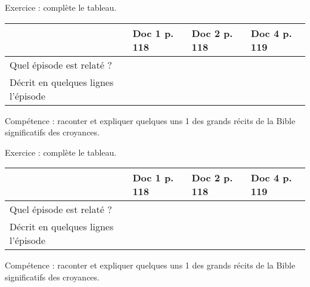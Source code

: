 \documentclass[12pt]{article}
\begin{document}
\vfill

Exercice : complète le tableau.

\begin{tabular}{|p{3cm}|p{4cm}|p{4cm}|p{4cm}}
\hline  & Doc 1 p. 118 & Doc 2 p. 118 & Doc 4 p. 119 \\ 
\hline Quel épisode est relaté ? & \hspace{4cm} &  &  \\ 
\hline Décrit en quelques lignes l'épisode & \hspace{10cm}  &  &  \\ 
\hline 
\end{tabular} 

\vspace{1cm}

Compétence : raconter et expliquer quelques uns 1 des grands récits de la Bible significatifs des croyances.

\vfill

Exercice : complète le tableau.

\begin{tabular}{|p{3cm}|p{4cm}|p{4cm}|p{4cm}}
\hline  & Doc 1 p. 118 & Doc 2 p. 118 & Doc 4 p. 119 \\ 
\hline Quel épisode est relaté ? & \hspace{4cm} &  &  \\ 
\hline Décrit en quelques lignes l'épisode & \hspace{10cm}  &  &  \\ 
\hline 
\end{tabular} 

\vspace{1cm}

Compétence : raconter et expliquer quelques uns 1 des grands récits de la Bible significatifs des croyances.
\end{document}
